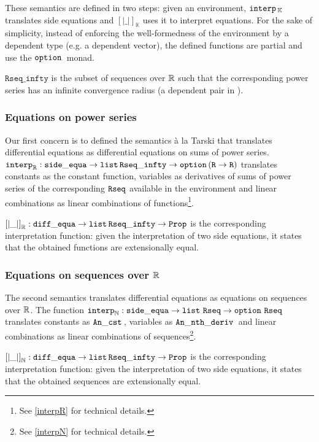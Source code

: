 \documentclass{article}
\begin{document}
These semantics are defined in two steps: given an environment,
$\operatorname{\mathtt{interp}}{}_{\mathbb{K}}$ translates side equations and
$\left[\left| \_ \right|\right]_{\mathbb{K}}$ uses it to interpret equations.
For the sake of simplicity, instead of enforcing the well-formedness of the
environment by a dependent type (e.g. a dependent vector),
the defined functions are partial and use the $\operatorname{\mathtt{option}}{}$ monad.

$\mathtt{Rseq\_infty}$ is the subset of sequences over $\mathbb{R}$ such that the
corresponding power series has an infinite convergence radius (a dependent
pair in \coq{}).

\subsubsection{Equations on power series}

Our first concern is to defined the semantics \`a la Tarski that translates
differential equations as differential equations on sums of power series.
$\operatorname{\operatorname{\mathtt{interp}}_{\mathbb{R}}} : \operatorname{\mathtt{side\_equa}} \rightarrow \operatorname{\mathtt{list}}{} \mathtt{Rseq\_infty} \rightarrow \operatorname{\mathtt{option}}{}
(\texttt{R} \rightarrow \texttt{R})$ translates constants as the constant function,
variables as derivatives of sums of power series of the corresponding $\operatorname{\mathtt{Rseq}}$
available in the environment and linear combinations as linear combinations of
functions\footnote{See \ref{interpR} for technical details.}.

$\left[\left| \_ \right|\right]_{\mathbb{R}} : \operatorname{\mathtt{diff\_equa}} \rightarrow \operatorname{\mathtt{list}}{}
\mathtt{Rseq\_infty} \rightarrow \texttt{Prop}$ is the corresponding interpretation
function: given the interpretation of two side equations, it states that the
obtained functions are extensionally equal.

\subsubsection{Equations on sequences over $\mathbb{R}$}

The second semantics translates differential equations as equations on
sequences over $\mathbb{R}$.  The function $\operatorname{\operatorname{\mathtt{interp}}_{\mathbb{N}}} :
\operatorname{\mathtt{side\_equa}} \rightarrow \operatorname{\mathtt{list}}{} \operatorname{\mathtt{Rseq}} \rightarrow \operatorname{\mathtt{option}}{} \operatorname{\mathtt{Rseq}}$ translates
constants as $\operatorname{\mathtt{An\_cst}}{}$, variables as $\operatorname{\mathtt{An\_nth\_deriv}}{}$ and linear combinations as linear
combinations of sequences\footnote{See \ref{interpN} for technical details.}.

$\left[\left| \_ \right|\right]_{\mathbb{N}} : \operatorname{\mathtt{diff\_equa}} \rightarrow \operatorname{\mathtt{list}}{}
\mathtt{Rseq\_infty} \rightarrow \texttt{Prop}$ is the corresponding interpretation
function:  given the interpretation of two side equations, it states that the
obtained sequences are extensionally equal.
\end{document}
